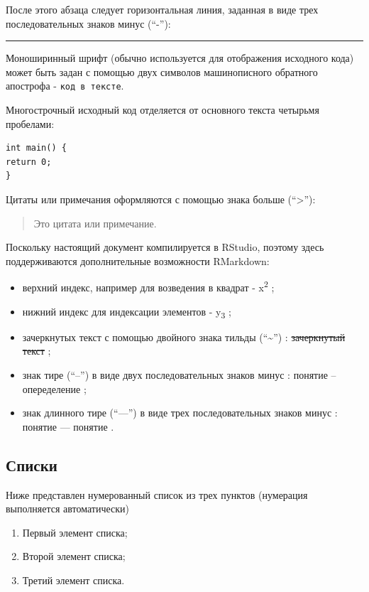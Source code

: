 \documentclass[
  a4paper,
]{book}
\providecommand{\tightlist}{%
  \setlength{\itemsep}{0pt}\setlength{\parskip}{0pt}}
\theoremstyle{definition}
\theoremstyle{definition}
\theoremstyle{definition}
\theoremstyle{definition}
\theoremstyle{remark}
\begin{document}
После этого абзаца следует горизонтальная линия, заданная в виде трех последовательных знаков минус (``-''):

\begin{center}\rule{0.5\linewidth}{0.5pt}\end{center}

Моноширинный шрифт (обычно используется для отображения исходного кода) может быть задан с помощью двух символов машинописного обратного апострофа - \texttt{код\ в\ тексте}.

Многострочный исходный код отделяется от основного текста четырьмя пробелами:

\begin{verbatim}
int main() {
return 0;
}
\end{verbatim}

Цитаты или примечания оформляются с помощью знака больше (``\textgreater{}''):

\begin{quote}
Это цитата или примечание.
\end{quote}

Поскольку настоящий документ компилируется в RStudio, поэтому здесь поддерживаются дополнительные возможности RMarkdown:

\begin{itemize}
\tightlist
\item
  верхний индекс, например для возведения в квадрат - x\textsuperscript{2} ;
\item
  нижний индекс для индексации элементов - y\textsubscript{3} ;
\item
  зачеркнутых текст с помощью двойного знака тильды (``\textasciitilde{}'') : \st{зачеркнутый текст} ;
\item
  знак тире (``--'') в виде двух последовательных знаков минус : понятие -- опеределение ;
\item
  знак длинного тире (``---'') в виде трех последовательных знаков минус : понятие --- понятие .
\end{itemize}

\subsection{Списки}\label{markdown-syntax-lists}

Ниже представлен нумерованный список из трех пунктов (нумерация выполняется автоматически)

\begin{enumerate}
\def\labelenumi{\arabic{enumi}.}
\tightlist
\item
  Первый элемент списка;
\item
  Второй элемент списка;
\item
  Третий элемент списка.
\end{enumerate}
\end{document}
